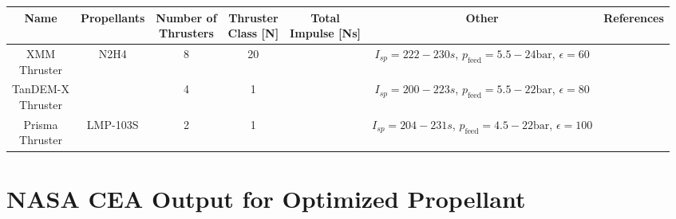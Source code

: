 \documentclass[12pt]{article}
\begin{document}
\newpage
\begin{adjustbox}{angle=90, center,caption={Overview of small propulsion systems using monopropellants.}}%
	\begin{tabular}{|c|c|c|c|c|c|c|}
		\hline
		Name & Propellants & \makecell{Number of\\Thrusters} & \makecell{Thruster\\Class {[}N{]}} & \makecell{Total\\Impulse [Ns]} & Other & References\\ \hline
		
		\makecell{XMM\\Thruster} & N2H4 & 8 & 20 & \makecell{$>517000$}  & \makecell{$I_{sp}=222-230s$,\\$p_{\text{feed}}=5.5-24\text{bar}$,\\$\epsilon=60$} & \makecell{ \cite{EsaXMM} \cite{ariane20N}} \\ \hline
		
		\makecell{TanDEM-X\\Thruster} & \makecell{N2H4} & 4 & 1 & \makecell{$>135000$}& \makecell{$I_{sp}=200-223s$,\\$p_{\text{feed}}=5.5-22\text{bar}$,\\$\epsilon=80$\\} & \makecell{\cite{tandemX} \cite{ariane1N}}\\ \hline
		
		\makecell{Prisma\\Thruster}& LMP-103S & 2 & 1 & \makecell{$\approx 108773$} & \makecell{$I_{sp}=204-231s$,\\$p_{\text{feed}}=4.5-22\text{bar}$,\\$\epsilon=100$} & \cite{hpgpThruster} \\ \hline
	\end{tabular}
	\label{tab:reference}
\end{adjustbox}

\newpage
\section{NASA CEA Output for Optimized Propellant}
\label{chap:cea_output}


\newpage
\printbibliography 
 
\end{document}
